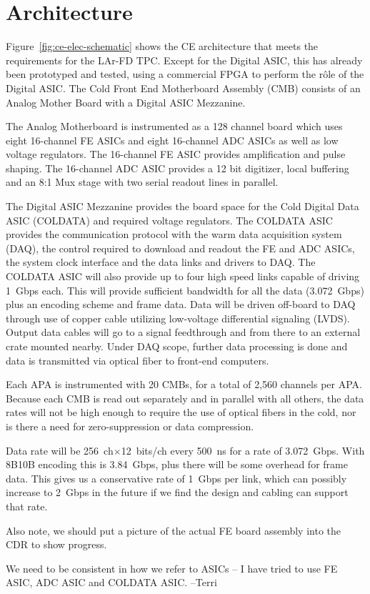 %
\section{Architecture}
\label{sec:fe-arch}

Figure~\ref{fig:ce-elec-schematic} shows the CE architecture that meets the requirements for the LAr-FD TPC.
Except for the Digital ASIC, this has already been prototyped and tested,
using a commercial FPGA to perform the r\^ole of the Digital ASIC.  
The Cold Front End Motherboard Assembly (CMB) consists of an Analog Mother Board with a Digital ASIC Mezzanine.  

The Analog Motherboard is instrumented as a 128 channel board which uses eight 16-channel FE ASICs and
eight 16-channel ADC ASICs as well as low voltage regulators.
The 16-channel FE ASIC provides amplification and pulse shaping.
The 16-channel ADC ASIC provides a 12 bit digitizer, local buffering and an 8:1 Mux stage with two serial readout lines in parallel.

The Digital ASIC Mezzanine provides the board space for the Cold Digital Data ASIC (COLDATA) and required voltage regulators.
The COLDATA ASIC provides the communication protocol with the warm data acquisition system (DAQ),
the control required to download and readout the FE and ADC ASICs,
the system clock interface and the data links and drivers to DAQ.
The COLDATA ASIC will also provide up to four high speed links capable of driving 1~Gbps each.
This will provide sufficient bandwidth for all the data (3.072~Gbps) plus an encoding scheme and frame data.
Data will be driven off-board to DAQ through use of copper cable utilizing low-voltage differential signaling (LVDS).
Output data cables will go to a signal feedthrough and from there to an external crate mounted nearby.
Under DAQ scope, further data processing is done and data is transmitted via optical fiber to front-end computers.

Each APA is instrumented with 20 CMBs, for a total of 2,560 channels per APA.
Because each CMB is read out separately and in parallel with all others,
the data rates will not be high enough to require the use of optical fibers in the cold,
nor is there a need for zero-suppression or data compression.

\begin{editornote}
  Data rate will be 256~ch$\times$12~bits/ch every 500~ns for a rate of 3.072~Gbps.
  With 8B10B encoding this is 3.84~Gbps, plus there will be some overhead for frame data.
  This gives us a conservative rate of 1~Gbps per link, which can possibly increase to 2~Gbps
  in the future if we find the design and cabling can support that rate.

  Also note, we should put a picture of the actual FE board assembly into the CDR to show progress.

  We need to be consistent in how we refer to ASICs -- I have tried to use FE ASIC, ADC ASIC and COLDATA ASIC.
  --Terri
\end{editornote}


